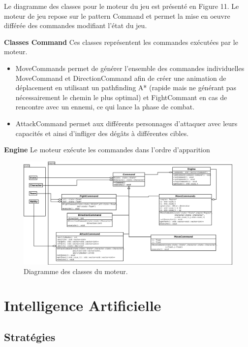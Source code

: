 \documentclass[a4paper,12pt]{article}
\begin{document}
Le diagramme des classes pour le moteur du jeu est présenté en Figure 11. Le moteur de jeu repose sur le pattern Command et permet la mise en oeuvre différée des commandes modifiant l'état du jeu.

\textbf{Classes Command} Ces classes représentent les commandes exécutées par le moteur. 
\begin{itemize}
\item MoveCommands permet de générer l'ensemble des commandes individuelles MoveCommand et DirectionCommand afin de créer une animation de déplacement en utilisant un pathfinding A* (rapide mais ne générant pas nécessairement le chemin le plus optimal) et FightCommant en cas de rencontre avec un ennemi, ce qui lance la phase de combat.
\item AttackCommand permet aux différents personnages d'attaquer avec leurs capacités et ainsi d'infliger des dégâts à différentes cibles.
\end{itemize}


\textbf{Engine} Le moteur exécute les commandes dans l'ordre d'apparition


\begin{landscape}
    \begin{figure}[p]
        \includegraphics[width=0.9\paperheight]{engine.png}
        \caption{\label{uml:engine}Diagramme des classes du moteur.}
    \end{figure}
\end{landscape}

\clearpage
\section{Intelligence Artificielle}

\subsection{Stratégies}
\end{document}
